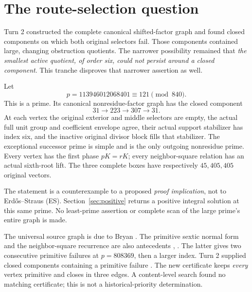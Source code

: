 \section{The route-selection question}
Turn 2 constructed the complete canonical shifted-factor graph and found closed
components on which both original selectors fail. Those components contained
large, changing obstruction quotients. The narrower possibility remained that
\emph{the smallest active quotient, of order six, could not persist around a
closed component}. This tranche disproves that narrower assertion as well.

\begin{theorem}\label{thm:triangle}
Let
\[
 p=113946012068401\equiv121\pmod{840}.
\]
This is a prime. Its canonical nonresidue-factor graph has the closed component
\[
 \boxed{31\longrightarrow223\longrightarrow307\longrightarrow31.} \tag{1}
\]
At each vertex the original exterior and middle selectors are empty, the actual
full unit group and coefficient envelope agree, their actual support stabilizer
has index six, and the inactive original divisor block fills that stabilizer.
The exceptional successor prime is simple and is the only outgoing nonresidue
prime. Every vertex has the first phase $pK=rK$; every neighbor-square relation
has an actual sixth-root lift. The three complete boxes have respectively
$45,405,405$ original vectors.
\end{theorem}
The statement is a counterexample to a proposed \emph{proof implication}, not to
Erd\H{o}s--Straus (ES). Section~\ref{sec:positive} returns a positive integral
solution at this same prime. No least-prime assertion or complete scan of the
large prime's entire graph is made.

The universal source graph is due to Bryan \cite[\S\S1--7]{BryanGraph}.
The primitive sextic normal form and the neighbor-square recurrence are also
antecedents \cite[\S\S3--8]{BryanSix}, \cite[\S\S2--4]{BryanChain}.
The latter gives two consecutive primitive failures at $p=808369$, then a larger
index. Turn 2 supplied closed components containing a primitive failure
\cite[\S\S7--8]{Turn2}. The new certificate keeps \emph{every} vertex primitive
and closes in three edges. A content-level search found no matching certificate;
this is not a historical-priority determination.

